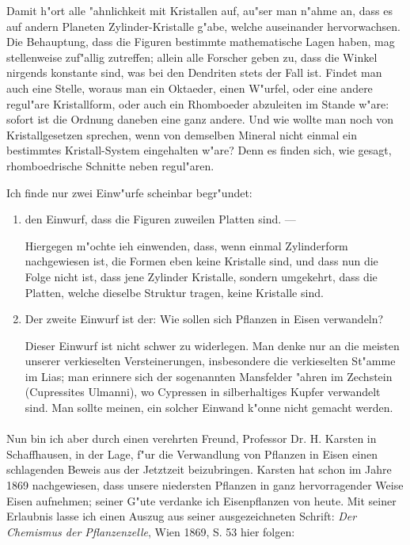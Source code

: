 \documentclass[a4paper, 11pt, oneside]{article}
\begin{document}
Damit h"ort alle "ahnlichkeit mit Kristallen auf, au"ser man n"ahme an, dass es auf andern Planeten Zylinder-Kristalle g"abe, welche auseinander hervorwachsen. Die Behauptung, dass die Figuren bestimmte mathematische Lagen haben, mag stellenweise zuf"allig zutreffen; allein alle Forscher geben zu, dass die Winkel nirgends konstante sind, was bei den Dendriten stets der Fall ist. Findet man auch eine Stelle, woraus man ein Oktaeder, einen W"urfel, oder eine andere regul"are Kristallform, oder auch ein Rhomboeder abzuleiten im Stande w"are: sofort ist die Ordnung daneben eine ganz andere. Und wie wollte man noch von Kristallgesetzen sprechen, wenn von demselben Mineral nicht einmal ein bestimmtes Kristall-System eingehalten w"are? Denn es finden sich, wie gesagt, rhomboedrische Schnitte neben regul"aren.

Ich finde nur zwei Einw"urfe scheinbar begr"undet:
\begin{enumerate}
\item den Einwurf, dass die Figuren zuweilen Platten sind. ---

Hiergegen m"ochte ieh einwenden, dass, wenn einmal Zylinderform nachgewiesen ist, die Formen eben keine Kristalle sind, und dass nun die Folge nicht ist, dass jene Zylinder Kristalle, sondern umgekehrt, dass die Platten, welche dieselbe Struktur tragen, keine Kristalle sind.
\item Der zweite Einwurf ist der: Wie sollen sich Pflanzen in Eisen verwandeln?

Dieser Einwurf ist nicht schwer zu widerlegen. Man denke nur an die meisten unserer verkieselten Versteinerungen, insbesondere die verkieselten St"amme im Lias; man erinnere sich der sogenannten Mansfelder "ahren im Zechstein (Cupressites Ulmanni), wo Cypressen in silberhaltiges Kupfer verwandelt sind. Man sollte meinen, ein solcher Einwand k"onne nicht gemacht werden.
\end{enumerate}
\paragraph{}
Nun bin ich aber durch einen verehrten Freund, Professor Dr. H. Karsten in Schaffhausen, in der Lage, f"ur die Verwandlung von Pflanzen in Eisen einen schlagenden Beweis aus der Jetztzeit beizubringen. Karsten hat schon im Jahre 1869 nachgewiesen, dass unsere niedersten Pflanzen in ganz hervorragender Weise Eisen aufnehmen; seiner G"ute verdanke ich Eisenpflanzen von heute. Mit seiner Erlaubnis lasse ich einen Auszug aus seiner ausgezeichneten Schrift: \emph{Der Chemismus der Pflanzenzelle}, Wien 1869, S. 53 hier folgen:
\end{document}
